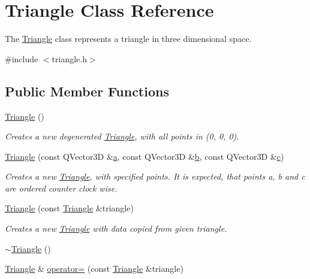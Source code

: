 \hypertarget{class_triangle}{}\section{Triangle Class Reference}
\label{class_triangle}


The \hyperlink{class_triangle}{Triangle} class represents a triangle in three dimensional space.  




{\ttfamily \#include $<$triangle.\+h$>$}

\subsection*{Public Member Functions}
\begin{DoxyCompactItemize}
\item 
\hyperlink{class_triangle_aaefe4ed500c07918d30c6f0e286332c5}{Triangle} ()
\begin{DoxyCompactList}\small\item\em Creates a new degenerated \hyperlink{class_triangle}{Triangle}, with all points in (0, 0, 0). \end{DoxyCompactList}\item 
\hyperlink{class_triangle_a89052ece2572bfee5d6ade44b9f5094d}{Triangle} (const Q\+Vector3\+D \&\hyperlink{class_triangle_a430bf0a9d8eaf20ea7bdefcd8082588c}{a}, const Q\+Vector3\+D \&\hyperlink{class_triangle_a8327124c9b9b752be94187c9fbf3f460}{b}, const Q\+Vector3\+D \&\hyperlink{class_triangle_a61f6c0245df276555de6d1b1a98840b8}{c})
\begin{DoxyCompactList}\small\item\em Creates a new \hyperlink{class_triangle}{Triangle}, with specified points. It is expected, that points a, b and c are ordered counter clock wise. \end{DoxyCompactList}\item 
\hyperlink{class_triangle_a889893fe34e2eb7121082b86199d5628}{Triangle} (const \hyperlink{class_triangle}{Triangle} \&triangle)
\begin{DoxyCompactList}\small\item\em Creates a new \hyperlink{class_triangle}{Triangle} with data copied from given triangle. \end{DoxyCompactList}\item 
\hyperlink{class_triangle_a5199760a17454f4dc94c855a57e3a152}{$\sim$\+Triangle} ()
\item 
\hyperlink{class_triangle}{Triangle} \& \hyperlink{class_triangle_aae57b61e09898f54256a83e76acfe502}{operator=} (const \hyperlink{class_triangle}{Triangle} \&triangle)

\end{DoxyCompactItemize}

